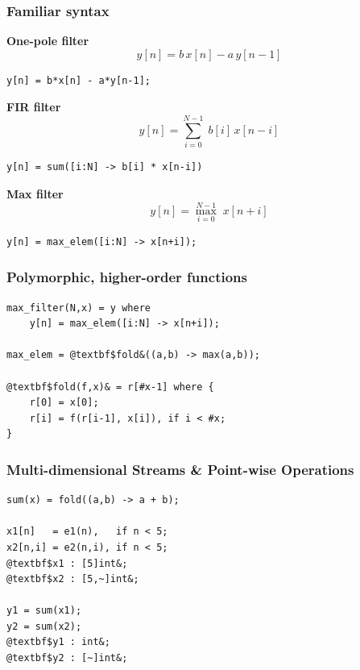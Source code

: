\documentclass{beamer}
\begin{document}
\begin{frame}[fragile]
\frametitle{Familiar syntax}

\textbf{One-pole filter}
\[y[n] = b\,x[n] - a\,y[n-1]\]
\begin{center}
\begin{BVerbatim}
y[n] = b*x[n] - a*y[n-1];
\end{BVerbatim}
\end{center}

\textbf{FIR filter}
\[y[n] = \sum_{i = 0}^{N-1} \; b[i]\,x[n-i]\]
\begin{center}
\begin{BVerbatim}
y[n] = sum([i:N] -> b[i] * x[n-i])
\end{BVerbatim}
\end{center}

\textbf{Max filter}
\[y[n] = \max_{i = 0}^{N-1} \; x[n+i]\]
\begin{center}
\begin{BVerbatim}
y[n] = max_elem([i:N] -> x[n+i]);
\end{BVerbatim}
\end{center}

\end{frame}


\begin{frame}[fragile]
\frametitle{Polymorphic, higher-order functions}

\begin{center}
\begin{BVerbatim}[commandchars=@$&]
max_filter(N,x) = y where
    y[n] = max_elem([i:N] -> x[n+i]);

max_elem = @textbf$fold&((a,b) -> max(a,b));

@textbf$fold(f,x)& = r[#x-1] where {
    r[0] = x[0];
    r[i] = f(r[i-1], x[i]), if i < #x;
}
\end{BVerbatim}
\end{center}

\end{frame}



\begin{frame}[fragile]
\frametitle{Multi-dimensional Streams \& Point-wise Operations}

\begin{center}
\begin{BVerbatim}[commandchars=@$&]
sum(x) = fold((a,b) -> a + b);

x1[n]   = e1(n),   if n < 5;
x2[n,i] = e2(n,i), if n < 5;
@textbf$x1 : [5]int&;
@textbf$x2 : [5,~]int&;

y1 = sum(x1);
y2 = sum(x2);
@textbf$y1 : int&;
@textbf$y2 : [~]int&;
\end{BVerbatim}
\end{center}

\end{frame}
\end{document}
